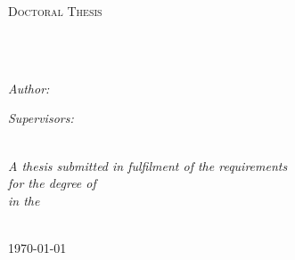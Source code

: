\documentclass[
11pt, %
english, %
singlespacing, %
headsepline, %
]{MastersDoctoralThesis} %
\author{Alaeddin \textsc{Nassani}} %
\begin{document}
\frontmatter %

\pagestyle{plain} %


\begin{titlepage}
\begin{center}

\vspace*{.06\textheight}
{\scshape\LARGE \univname\par}\vspace{1.5cm} %
\textsc{\Large Doctoral Thesis}\\[0.5cm] %

\HRule \\[0.4cm] %
{\huge \bfseries \ttitle\par}\vspace{0.4cm} %
\HRule \\[1.5cm] %
 
\begin{minipage}[t]{0.4\textwidth}
\begin{flushleft} \large
\emph{Author:}\\
{\authorname} %
\end{flushleft}
\end{minipage}

\vfill

\begin{minipage}[t]{0.4}
    \large
    \emph{Supervisors:} \\
    {\supname} %
\end{minipage}\\[3cm]

\large \textit{A thesis submitted in fulfilment of the requirements\\ for the degree of \degreename}\\[0.3cm] %
\textit{in the}\\[0.4cm]
\deptname\\[2cm] %
 
\vfill

{\large \today}\\[4cm] %
 
\vfill
\end{center}
\end{titlepage}
\end{document}
